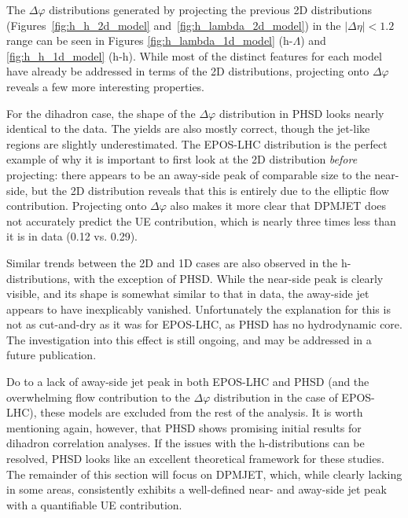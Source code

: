 The $\Delta\varphi$ distributions generated by projecting the previous 2D distributions (Figures~\ref{fig:h_h_2d_model} and~\ref{fig:h_lambda_2d_model}) in the $|\Delta\eta| < 1.2$ range can be seen in Figures \ref{fig:h_lambda_1d_model} (h-$\Lambda$) and \ref{fig:h_h_1d_model} (h-h). While most of the distinct features for each model have already be addressed in terms of the 2D distributions, projecting onto $\Delta\varphi$ reveals a few more interesting properties. 

For the dihadron case, the shape of the $\Delta\varphi$ distribution in PHSD looks nearly identical to the data. The yields are also mostly correct, though the jet-like regions are slightly underestimated. The EPOS-LHC distribution is the perfect example of why it is important to first look at the 2D distribution \textit{before} projecting: there appears to be an away-side peak of comparable size to the near-side, but the 2D distribution reveals that this is entirely due to the elliptic flow contribution. Projecting onto $\Delta\varphi$ also makes it more clear that DPMJET does not accurately predict the UE contribution, which is nearly three times less than it is in data (0.12 vs. 0.29). 

Similar trends between the 2D and 1D cases are also observed in the h-\lmb distributions, with the exception of PHSD. While the near-side peak is clearly visible, and its shape is somewhat similar to that in data, the away-side jet appears to have inexplicably vanished. Unfortunately the explanation for this is not as cut-and-dry as it was for EPOS-LHC, as PHSD has no hydrodynamic core. The investigation into this effect is still ongoing, and may be addressed in a future publication.

Do to a lack of away-side jet peak in both EPOS-LHC and PHSD (and the overwhelming flow contribution to the $\Delta\varphi$ distribution in the case of EPOS-LHC), these models are excluded from the rest of the analysis. It is worth mentioning again, however, that PHSD shows promising initial results for dihadron correlation analyses. If the issues with the h-\lmb distributions can be resolved, PHSD looks like an excellent theoretical framework for these studies. The remainder of this section will focus on DPMJET, which, while clearly lacking in some areas, consistently exhibits a well-defined near- and away-side jet peak with a quantifiable UE contribution.

